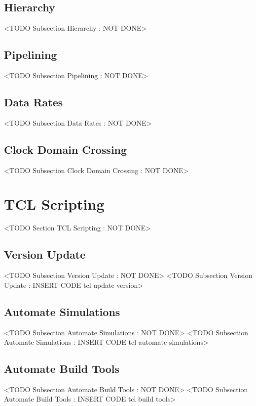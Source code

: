 \subsection{Hierarchy} 
	<TODO Subsection Hierarchy : NOT DONE>

\subsection{Pipelining}
	<TODO Subsection Pipelining : NOT DONE>

\subsection{Data Rates}
	<TODO Subsection Data Rates : NOT DONE>

\subsection{Clock Domain Crossing}
	<TODO Subsection Clock Domain Crossing : NOT DONE>
	
\section{TCL Scripting}
	<TODO Section TCL Scripting : NOT DONE>

\subsection{Version Update}
	<TODO Subsection Version Update : NOT DONE>
	<TODO Subsection Version Update : INSERT CODE tcl update version>

\subsection{Automate Simulations}
	<TODO Subsection Automate Simulations : NOT DONE>
	<TODO Subsection Automate Simulations : INSERT CODE tcl automate simulations>

\subsection{Automate Build Tools}
	<TODO Subsection Automate Build Tools : NOT DONE>
	<TODO Subsection Automate Build Tools : INSERT CODE tcl build tools>

